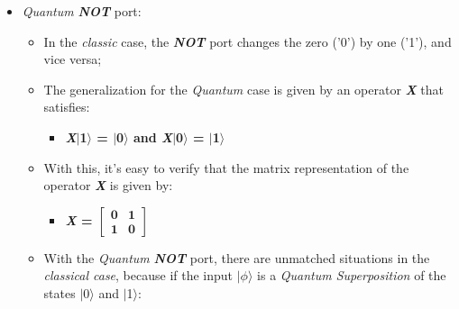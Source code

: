 \documentclass[conference]{IEEEtran}
\begin{document}
\begin{itemize}
    \item \textit{Quantum} \textit{\textbf{NOT}} port:
    \begin{itemize}
        \item In the \textit{classic} case, the \textit{\textbf{NOT}} port changes the zero ('0') by one ('1'), and vice versa;
        \item The generalization for the \textit{Quantum} case is given by an operator \textit{\textbf{X}} that satisfies:
        
        \vspace{4pt}
        
        \begin{itemize}
            \item 
            \begin{center}
                \textbf{
                    \textit{X}$\mid$1$\rangle$ = $\mid$0$\rangle$ and \textit{X}$\mid$0$\rangle$ = $\mid$1$\rangle$
                }
            \end{center}
        \end{itemize}
        
        \vspace{4pt}
        
        \item With this, it's easy to verify that the matrix representation of the operator \textit{\textbf{X}} is given by:
        
        \vspace{4pt}
        
        \begin{itemize}
            \item 
            \begin{center}
                \textbf{
                    \textit{X} = ${
                    \begin{bmatrix}
                        \textbf{0} & \textbf{1}\\
                        \textbf{1} & \textbf{0}
                    \end{bmatrix}}$
                }
            \end{center}
        \end{itemize}
        
        \vspace{4pt}
        
        \item With the \textit{Quantum} \textit{\textbf{NOT}} port, there are unmatched situations in the \textit{classical case}, because if the input $\mid$$\phi$$\rangle$ is a \textit{Quantum Superposition} of the states $\mid$0$\rangle$ and $\mid$1$\rangle$:
        

\end{itemize}
\end{itemize}
\end{document}

